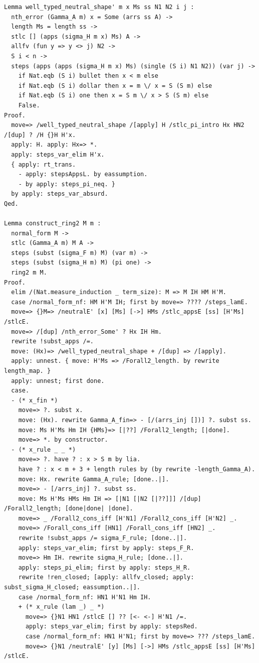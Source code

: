 \begin{lstlisting}
Lemma well_typed_neutral_shape' m x Ms ss N1 N2 i j :
  nth_error (Gamma_A m) x = Some (arrs ss A) ->
  length Ms = length ss ->
  stlc [] (apps (sigma_H m x) Ms) A ->
  allfv (fun y => y <> j) N2 ->
  S i < n ->
  steps (apps (apps (sigma_H m x) Ms) (single (S i) N1 N2)) (var j) ->
    if Nat.eqb (S i) bullet then x < m else
    if Nat.eqb (S i) dollar then x = m \/ x = S (S m) else
    if Nat.eqb (S i) one then x = S m \/ x > S (S m) else
    False.
Proof.
  move=> /well_typed_neutral_shape /[apply] H /stlc_pi_intro Hx HN2 /[dup] ? /H {}H H'x.
  apply: H. apply: Hx=> *.
  apply: steps_var_elim H'x.
  { apply: rt_trans.
    - apply: stepsAppsL. by eassumption.
    - by apply: steps_pi_neq. }
  by apply: steps_var_absurd.
Qed.

Lemma construct_ring2 M m :
  normal_form M ->
  stlc (Gamma_A m) M A ->
  steps (subst (sigma_F m) M) (var m) ->
  steps (subst (sigma_H m) M) (pi one) ->
  ring2 m M.
Proof.
  elim /(Nat.measure_induction _ term_size): M => M IH HM H'M.
  case /normal_form_nf: HM H'M IH; first by move=> ???? /steps_lamE.
  move=> {}M=> /neutralE' [x] [Ms] [->] HMs /stlc_appsE [ss] [H'Ms] /stlcE.
  move=> /[dup] /nth_error_Some' ? Hx IH Hm.
  rewrite !subst_apps /=.
  move: (Hx)=> /well_typed_neutral_shape + /[dup] => /[apply].
  apply: unnest. { move: H'Ms => /Forall2_length. by rewrite length_map. }
  apply: unnest; first done.
  case.
  - (* x_fin *)
    move=> ?. subst x.
    move: (Hx). rewrite Gamma_A_fin=> - [/(arrs_inj [])] ?. subst ss.
    move: Ms H'Ms Hm IH {HMs}=> [|??] /Forall2_length; [|done].
    move=> *. by constructor.
  - (* x_rule _ _ *)
    move=> ?. have ? : x > S m by lia.
    have ? : x < m + 3 + length rules by (by rewrite -length_Gamma_A).
    move: Hx. rewrite Gamma_A_rule; [done..|].
    move=> - [/arrs_inj] ?. subst ss.
    move: Ms H'Ms HMs Hm IH => [|N1 [|N2 [|??]]] /[dup] /Forall2_length; [done|done| |done].
    move=> _ /Forall2_cons_iff [H'N1] /Forall2_cons_iff [H'N2] _.
    move=> /Forall_cons_iff [HN1] /Forall_cons_iff [HN2] _.
    rewrite !subst_apps /= sigma_F_rule; [done..|].
    apply: steps_var_elim; first by apply: steps_F_R.
    move=> Hm IH. rewrite sigma_H_rule; [done..|].
    apply: steps_pi_elim; first by apply: steps_H_R.
    rewrite !ren_closed; [apply: allfv_closed; apply: subst_sigma_H_closed; eassumption..|].
    case /normal_form_nf: HN1 H'N1 Hm IH.
    + (* x_rule (lam _) _ *)
      move=> {}N1 HN1 /stlcE [] ?? [<- <-] H'N1 /=.
      apply: steps_var_elim; first by apply: stepsRed.
      case /normal_form_nf: HN1 H'N1; first by move=> ??? /steps_lamE.
      move=> {}N1 /neutralE' [y] [Ms] [->] HMs /stlc_appsE [ss] [H'Ms] /stlcE.

\end{lstlisting}
